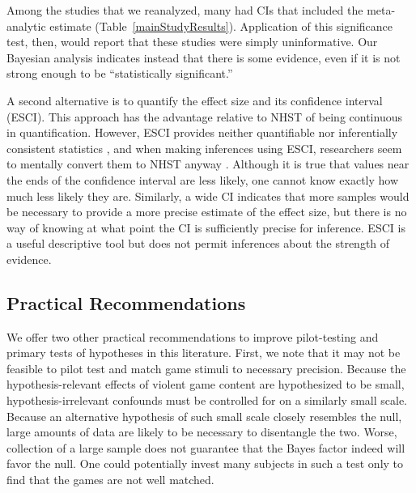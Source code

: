 \documentclass[man]{apa6}
\begin{document}
Among the studies that we reanalyzed, many had CIs that included the meta-analytic estimate (Table~\ref{mainStudyResults}). Application of this significance test, then, would report that these studies were simply uninformative. Our Bayesian analysis indicates instead that there is some evidence, even if it is not strong enough to be ``statistically significant.''   

A second alternative is to quantify the effect size and its confidence interval (ESCI). This approach has the advantage relative to NHST of being continuous in quantification.  However, ESCI provides neither quantifiable nor inferentially consistent statistics \citep[see][]{Morey:etal:2014}, and when making inferences using ESCI, researchers seem to mentally convert them to NHST anyway \citep{Hoekstra:etal:2014}.  Although it is true that values near the ends of the confidence interval are less likely, one cannot know exactly how much less likely they are. Similarly, a wide CI indicates that more samples would be necessary to provide a more precise estimate of the effect size, but there is no way of knowing at what point the CI is sufficiently precise for inference. ESCI is a useful descriptive tool but does not permit inferences about the strength of evidence.

\subsection{Practical Recommendations}
We offer two other practical recommendations to improve pilot-testing and primary tests of hypotheses in this literature. First, we note that it may not be feasible to pilot test and match game stimuli to necessary precision. Because the hypothesis-relevant effects of violent game content are hypothesized to be small, hypothesis-irrelevant confounds must be controlled for on a similarly small scale. Because an alternative hypothesis of such small scale closely resembles the null, large amounts of data are likely to be necessary to disentangle the two. Worse, collection of a large sample does not guarantee that the Bayes factor indeed will favor the null. One could potentially invest many subjects in such a test only to find that the games are not well matched. 
\end{document}
